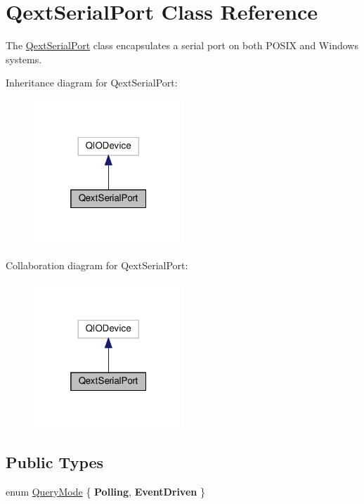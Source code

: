 \hypertarget{classQextSerialPort}{}\section{Qext\+Serial\+Port Class Reference}
\label{classQextSerialPort}


The \hyperlink{classQextSerialPort}{Qext\+Serial\+Port} class encapsulates a serial port on both P\+O\+S\+IX and Windows systems.  




Inheritance diagram for Qext\+Serial\+Port\+:\nopagebreak
\begin{figure}[H]
\begin{center}
\leavevmode
\includegraphics[width=160pt]{classQextSerialPort__inherit__graph}
\end{center}
\end{figure}


Collaboration diagram for Qext\+Serial\+Port\+:\nopagebreak
\begin{figure}[H]
\begin{center}
\leavevmode
\includegraphics[width=160pt]{classQextSerialPort__coll__graph}
\end{center}
\end{figure}
\subsection*{Public Types}
\begin{DoxyCompactItemize}
\item 
enum \hyperlink{classQextSerialPort_a6002128d7351ea9a958d6a6d1fc6b9bd}{Query\+Mode} \{ {\bfseries Polling}, 
{\bfseries Event\+Driven}
 \}
\end{DoxyCompactItemize}
